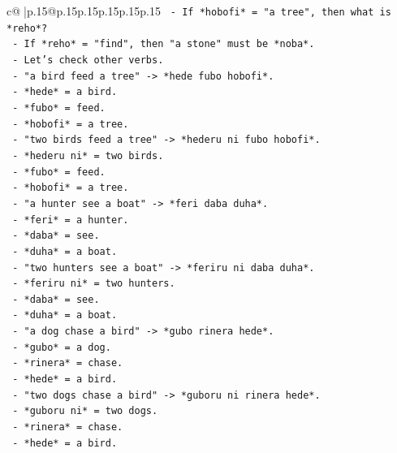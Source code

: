 \documentclass{article}
\begin{document}
{\begin{supertabular}{c@{$\;$}|p{.15\linewidth}@{}p{.15\linewidth}p{.15\linewidth}p{.15\linewidth}p{.15\linewidth}p{.15\linewidth}}
{{{\texttt{            {-} If *hobofi* = "a tree", then what is *reho*?} \\
\texttt{            {-} If *reho* = "find", then "a stone" must be *noba*.} \\
\texttt{            {-} Let's check other verbs.} \\
\texttt{            {-} "a bird feed a tree" {-}> *hede fubo hobofi*.} \\
\texttt{              {-} *hede* = a bird.} \\
\texttt{              {-} *fubo* = feed.} \\
\texttt{              {-} *hobofi* = a tree.} \\
\texttt{            {-} "two birds feed a tree" {-}> *hederu ni fubo hobofi*.} \\
\texttt{              {-} *hederu ni* = two birds.} \\
\texttt{              {-} *fubo* = feed.} \\
\texttt{              {-} *hobofi* = a tree.} \\
\texttt{            {-} "a hunter see a boat" {-}> *feri daba duha*.} \\
\texttt{              {-} *feri* = a hunter.} \\
\texttt{              {-} *daba* = see.} \\
\texttt{              {-} *duha* = a boat.} \\
\texttt{            {-} "two hunters see a boat" {-}> *feriru ni daba duha*.} \\
\texttt{              {-} *feriru ni* = two hunters.} \\
\texttt{              {-} *daba* = see.} \\
\texttt{              {-} *duha* = a boat.} \\
\texttt{            {-} "a dog chase a bird" {-}> *gubo rinera hede*.} \\
\texttt{              {-} *gubo* = a dog.} \\
\texttt{              {-} *rinera* = chase.} \\
\texttt{              {-} *hede* = a bird.} \\
\texttt{            {-} "two dogs chase a bird" {-}> *guboru ni rinera hede*.} \\
\texttt{              {-} *guboru ni* = two dogs.} \\
\texttt{              {-} *rinera* = chase.} \\
\texttt{              {-} *hede* = a bird.} \\
}}}
\end{supertabular}}
\end{document}
